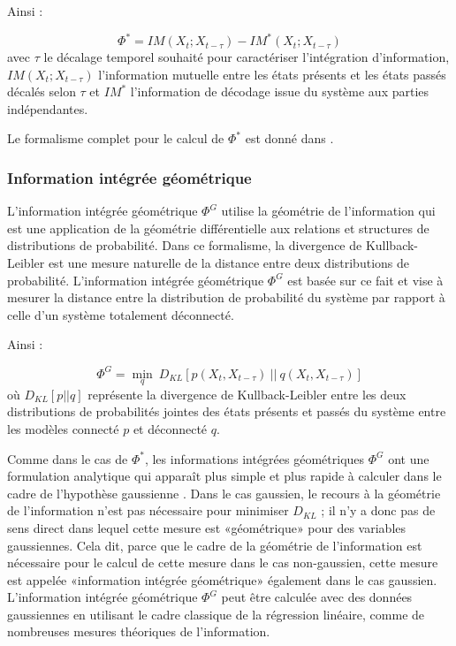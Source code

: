 Ainsi : 

\begin{equation} 
\Phi^* = IM(X_t;X_{t-\tau}) - IM^*(X_t;X_{t-\tau})
\end{equation}
avec $\tau$ le décalage temporel souhaité pour caractériser l'intégration d'information, $IM(X_t;X_{t-\tau})$ l'information mutuelle entre les états présents et les états passés décalés selon $\tau$ et $IM^*$ l'information de décodage issue du système aux parties indépendantes. 

Le formalisme complet pour le calcul de $\Phi^*$ est donné dans \cite{oizumi2016measuring}.

\subsubsection*{Information intégrée géométrique}
\label{phig}

L'information intégrée géométrique $\Phi^G$ utilise la géométrie de l'information qui est une application de la géométrie différentielle aux relations et structures de distributions de probabilité. 
Dans ce formalisme, la divergence de Kullback-Leibler est une mesure naturelle de la distance entre deux distributions de probabilité. 
L'information intégrée géométrique $\Phi^G$ est basée sur ce fait et vise à mesurer la distance entre la distribution de probabilité du système par rapport à celle d'un système totalement déconnecté. 

Ainsi : 

\begin{equation}
\Phi^G = \min \limits_q ~ D_{KL} \left[ p(X_t, X_{t-\tau}) ~ || ~ q(X_t, X_{t-\tau}) \right]
\end{equation}
où $D_{KL}[p||q]$ représente la divergence de Kullback-Leibler entre les deux distributions de probabilités jointes des états présents et passés du système entre les modèles connecté $p$ et déconnecté $q$.

Comme dans le cas de $\Phi^*$, les informations intégrées géométriques $\Phi^G$ ont une formulation analytique qui apparaît plus simple et plus rapide à calculer dans le cadre de l'hypothèse gaussienne \citep{oizumi2016unified}. 
Dans le cas gaussien, le recours à la géométrie de l'information n'est pas nécessaire pour minimiser $D_{KL}$ ; il n'y a donc pas de sens direct dans lequel cette mesure est «géométrique» pour des variables gaussiennes. 
Cela dit, parce que le cadre de la géométrie de l'information est nécessaire pour le calcul de cette mesure dans le cas non-gaussien, cette mesure est appelée «information intégrée géométrique» également dans le cas gaussien. 
L'information intégrée géométrique $\Phi^G$  peut être calculée avec des données gaussiennes en utilisant le cadre classique de la régression linéaire, comme de nombreuses mesures théoriques de l'information. 

